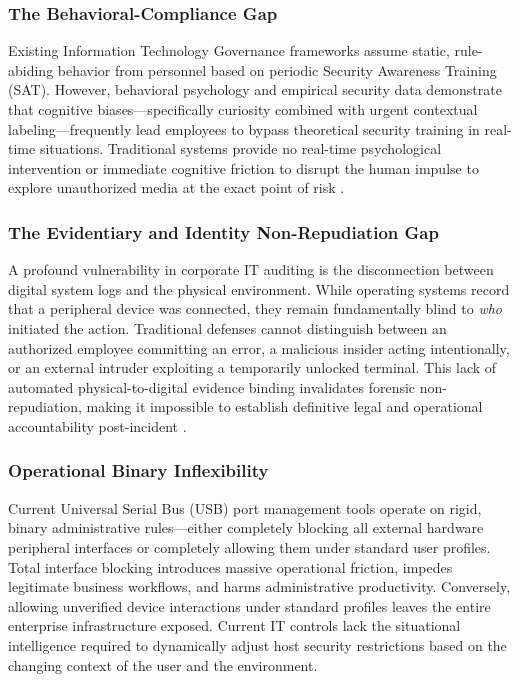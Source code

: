 \documentclass{ieeeaccess}
\begin{document}
\subsubsection{The Behavioral-Compliance Gap}
Existing Information Technology Governance frameworks assume static, rule-abiding behavior from personnel based on periodic Security Awareness Training (SAT). However, behavioral psychology and empirical security data demonstrate that cognitive biases—specifically curiosity combined with urgent contextual labeling—frequently lead employees to bypass theoretical security training in real-time situations. Traditional systems provide no real-time psychological intervention or immediate cognitive friction to disrupt the human impulse to explore unauthorized media at the exact point of risk \cite{ref4}.

\subsubsection{The Evidentiary and Identity Non-Repudiation Gap}
A profound vulnerability in corporate IT auditing is the disconnection between digital system logs and the physical environment. While operating systems record that a peripheral device was connected, they remain fundamentally blind to \textit{who} initiated the action. Traditional defenses cannot distinguish between an authorized employee committing an error, a malicious insider acting intentionally, or an external intruder exploiting a temporarily unlocked terminal. This lack of automated physical-to-digital evidence binding invalidates forensic non-repudiation, making it impossible to establish definitive legal and operational accountability post-incident \cite{ref5}.

\subsubsection{Operational Binary Inflexibility}
Current Universal Serial Bus (USB) port management tools operate on rigid, binary administrative rules—either completely blocking all external hardware peripheral interfaces or completely allowing them under standard user profiles. Total interface blocking introduces massive operational friction, impedes legitimate business workflows, and harms administrative productivity. Conversely, allowing unverified device interactions under standard profiles leaves the entire enterprise infrastructure exposed. Current IT controls lack the situational intelligence required to dynamically adjust host security restrictions based on the changing context of the user and the environment.
\end{document}
